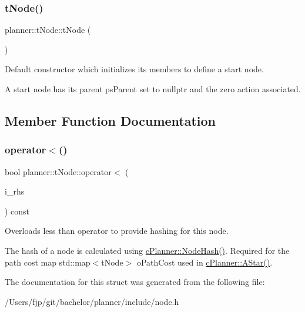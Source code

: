 \subsubsection{\texorpdfstring{t\+Node()}{tNode()}}
{\footnotesize\ttfamily planner\+::t\+Node\+::t\+Node (\begin{DoxyParamCaption}{ }\end{DoxyParamCaption})\hspace{0.3cm}{\ttfamily [inline]}}



Default constructor which initializes its members to define a start node. 

A start node has its parent ps\+Parent set to nullptr and the zero action associated. 

\subsection{Member Function Documentation}
\mbox{\label{structplanner_1_1t_node_a5085f3fcf4a960ed9fe14068f1b5e950}} 
\subsubsection{\texorpdfstring{operator$<$()}{operator<()}}
{\footnotesize\ttfamily bool planner\+::t\+Node\+::operator$<$ (\begin{DoxyParamCaption}\item[{const \mbox{\hyperlink{structplanner_1_1t_node}{t\+Node}} \&}]{i\+\_\+rhs }\end{DoxyParamCaption}) const\hspace{0.3cm}{\ttfamily [inline]}}



Overloads less than operator to provide hashing for this node. 

The hash of a node is calculated using \mbox{\hyperlink{classplanner_1_1c_planner_a4c99873ce64b214899d65eda6366455f}{c\+Planner\+::\+Node\+Hash()}}. Required for the path cost map std\+::map$<$t\+Node$>$ o\+Path\+Cost used in \mbox{\hyperlink{classplanner_1_1c_planner_a341e70531266f023ac9461d18979d1ef}{c\+Planner\+::\+A\+Star()}}. 

The documentation for this struct was generated from the following file\+:\begin{DoxyCompactItemize}
\item 
/\+Users/fjp/git/bachelor/planner/include/node.\+h\end{DoxyCompactItemize}

